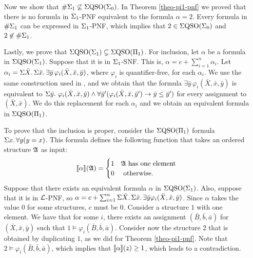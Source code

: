 \vspace{1em}
Now we show that $\#\Sigma_{1}\not\subseteq\Sigma{\rm QSO}(\Sigma_{0})$. In Theorem \ref{theo-pi1-pnf} we proved that there is no formula in $\Sigma_{1}$-PNF equivalent to the formula $\alpha = 2$. Every formula in $\#\Sigma_{1}$ can be expressed in $\Sigma_{1}$-PNF, which implies that $2 \in \Sigma{\rm QSO}(\Sigma_{0})$ and $2 \not\in \#\Sigma_{1}$.

\vspace{1em}
Lastly, we prove that $\Sigma{\rm QSO}(\Sigma_{1})\subsetneq\Sigma{\rm QSO}(\Pi_{1})$. For inclusion, let $\alpha$ be a formula in $\Sigma{\rm QSO}(\Sigma_{1})$. Suppose that it is in $\Sigma_{1}$-SNF. This is, $\alpha = c + \sum_{i = 1}^{n}\alpha_i$. Let $\alpha_i = \Sigma{\bar{X}}.\,\Sigma{\bar{x}}.\,\exists\bar{y}\,\varphi_i(\bar{X},\bar{x},\bar{y})$, where $\varphi_i$ is quantifier-free, for each $\alpha_i$. We use the same construction used in \cite{SalujaST95}, and we obtain that the formula $\exists\bar{y}\,\varphi_i(\bar{X},\bar{x},\bar{y})$ is equivalent to $\Sigma{\bar{y}}.\,\,\varphi_i(\bar{X},\bar{x},\bar{y}) \wedge \forall\bar{y}'(\varphi_i(\bar{X},\bar{x},\bar{y}')\to\bar{y}\leq\bar{y}')$ for every assignment to $(\bar{X},\bar{x})$. We do this replacement for each $\alpha_i$ and we obtain an equivalent formula in $\Sigma{\rm QSO}(\Pi_{1})$.

To prove that the inclusion is proper, consider the $\Sigma{\rm QSO}(\Pi_{1})$ formula $\Sigma{x}.\,\forall y(y = x)$. This formula defines the following function that takes an ordered structure $\mathfrak{A}$ as input:
$$
{\llbracket{}{\alpha}\rrbracket}(\mathfrak{A}) = 
\begin{cases}
1 &\mathfrak{A} \text{ has one element}\\
0 &\text{ otherwise}.
\end{cases}
$$
Suppose that there exists an equivalent formula $\alpha$ in $\Sigma{\rm QSO}(\Sigma_{1})$. Also, suppose that it is in $\L$-PNF, so $\alpha = c + \sum_{i = 1}^n\Sigma{\bar{X}}.\,\Sigma{\bar{x}}.\,\exists\bar{y}\varphi_i(\bar{X},\bar{x},\bar{y})$. Since $\alpha$ takes the value 0 for some structures, $c$ must be 0. Consider a structure $\mathfrak{1}$ with one element. We have that for some $i$, there exists an assignment $(\bar{B},\bar{b},\bar{a})$ for $(\bar{X},\bar{x},\bar{y})$ such that $\mathfrak{1}\models\varphi_i(\bar{B},\bar{b},\bar{a})$. Consider now the structure $\mathfrak{2}$ that is obtained by duplicating $\mathfrak{1}$, as we did for Theorem \ref{theo-pi1-pnf}. Note that $\mathfrak{2}\models\varphi_i(\bar{B},\bar{b},\bar{a})$, which implies that ${\llbracket{}{\alpha}\rrbracket}(\mathfrak{2}) \geq 1$, which leads to a contradiction.










